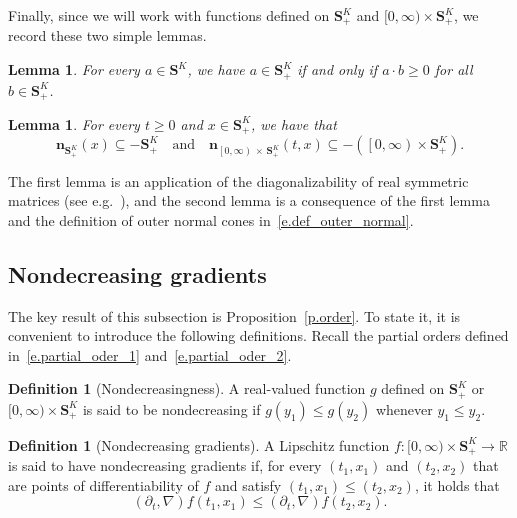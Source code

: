 \documentclass[10pt]{amsart}
\newtheorem{lemm}[theo]{Lemma}\newtheorem{prop}[theo]{Proposition}\newtheorem{coro}[theo]{Corollary}\newtheorem{conj}[theo]{Conjecture}
\theoremstyle{definition}\newtheorem{defi}[theo]{Definition}\newtheorem{rema}[theo]{Remark}\newtheorem{exam}[theo]{Example}\newtheorem{exem}[theo]{Example}\newtheorem{nota}[theo]{Notation}
\newcommand{\R}{\mathbb{R}}
\renewcommand{\S}{\mathbf{S}}
\newcommand{\bfn}{\mathbf{n}}
\renewcommand{\leq}{\leqslant}
\renewcommand{\geq}{\geqslant}
\renewcommand{\subset}{\subseteq}
\begin{document}
Finally, since we will work with functions defined on $\S^K_+$ and $[0,\infty)\times \S^K_+$, we record these two simple lemmas.

\begin{lemm}\label{l.psd}
For every $a \in \S^K$, we have $a\in \S^K_+$ if and only if $a\cdot b \geq 0$ for all $b\in\S^K_+$.
\end{lemm}



\begin{lemm}\label{l.outer_normal}
For every $t\geq 0$ and $x \in \S^K_+$, we have that 
\[
\bfn_{\S^K_+}(x) \subset - \S^K_+\quad\text{and}\quad \bfn_{\left[0,\infty\right)\,\times\,\S^K_+}(t,x) \subset -\left(\left[0,\infty\right)\times \S^K_+\right).
\]
\end{lemm}

The first lemma is an application of the diagonalizability of real symmetric matrices (see e.g.~\cite[Lemma~2.2]{mourrat2019hamilton}), and the second lemma is a consequence of {the first lemma} and the definition of outer normal cones in~\eqref{e.def_outer_normal}.




\subsection{Nondecreasing gradients}
The key result of this subsection is Proposition~\ref{p.order}. To state it, it is convenient to introduce the following definitions. Recall the partial orders defined in~\eqref{e.partial_oder_1} and~\eqref{e.partial_oder_2}.


\begin{defi}[Nondecreasingness]\label{d.nondecreasing}
A real-valued function $g$ defined on $\S^K_+$ or $[0,\infty)\times \S^K_+$ is said to be nondecreasing if $g(y_1)\leq g(y_2)$ whenever $y_1\leq y_2$.
\end{defi}


\begin{defi}[Nondecreasing gradients]
A Lipschitz function $f:[0,\infty)\times \S^K_+\to \R$ is said to have nondecreasing gradients if, for every $(t_1,x_1)$ and $(t_2,x_2)$ that are {points of differentiability} of $f$ and satisfy $(t_1,x_1)\leq (t_2,x_2)$, it holds that
\begin{equation}\label{e.order}
\left(\partial_t,\nabla\right)f\left(t_1,x_1\right)\leq \left(\partial_t,\nabla\right)f\left(t_2,x_2\right).
\end{equation}
\end{defi}
\end{document}
